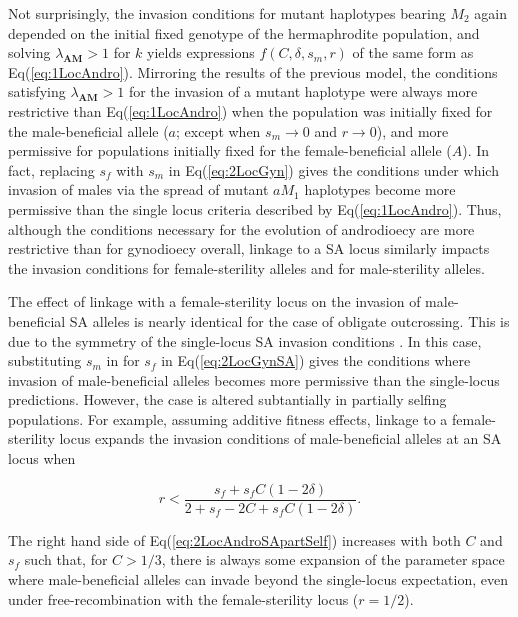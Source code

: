 \documentclass[9pt,twocolumn,twoside,lineno]{gsajnl}
\begin{document}
\noindent Not surprisingly, the invasion conditions for mutant haplotypes bearing $M_2$ again depended on the initial fixed genotype of the hermaphrodite population, and solving $\lambda_{\mathbf{AM}} > 1$ for $k$ yields expressions $f(C,\delta,s_m,r)$ of the same form as Eq(\ref{eq:1LocAndro}). Mirroring the results of the previous model, the conditions satisfying $\lambda_{\mathbf{AM}} > 1$ for the invasion of a mutant haplotype were always more restrictive than Eq(\ref{eq:1LocAndro}) when the population was initially fixed for the male-beneficial allele ($a$; except when $s_m \rightarrow 0$ and $r \rightarrow 0$), and more permissive for populations initially fixed for the female-beneficial allele ($A$). In fact, replacing $s_f$ with $s_m$ in Eq(\ref{eq:2LocGyn}) gives the conditions under which invasion of males via the spread of mutant $aM_1$ haplotypes become more permissive than the single locus criteria described by Eq(\ref{eq:1LocAndro}). Thus, although the conditions necessary for the evolution of androdioecy are more restrictive than for gynodioecy overall, linkage to a SA locus similarly impacts the invasion conditions for female-sterility alleles and for male-sterility alleles. 

The effect of linkage with a female-sterility locus on the invasion of male-beneficial SA alleles is nearly identical for the case of obligate outcrossing. This is due to the symmetry of the single-locus SA invasion conditions \citep{Kidwell1977}. In this case, substituting $s_m$ in for $s_f$ in Eq(\ref{eq:2LocGynSA}) gives the conditions where invasion of male-beneficial alleles becomes more permissive than the single-locus predictions. However, the case is altered subtantially in partially selfing populations. For example, assuming additive fitness effects, linkage to a female-sterility locus expands the invasion conditions of male-beneficial alleles at an SA locus when

\begin{equation}\label{eq:2LocAndroSApartSelf}
	r < \frac{s_f + s_f C (1 - 2 \delta)}{2 + s_f - 2 C + s_f C (1 - 2 \delta)}.
\end{equation}

\noindent The right hand side of Eq(\ref{eq:2LocAndroSApartSelf}) increases with both $C$ and $s_f$ such that, for $C > 1/3$, there is always some expansion of the parameter space where male-beneficial alleles can invade beyond the single-locus expectation, even under free-recombination with the female-sterility locus ($r = 1/2$). 
\end{document}
